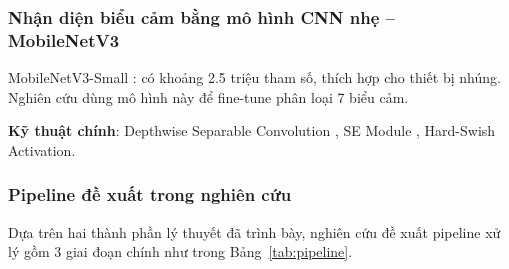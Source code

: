 \subsubsection{Nhận diện biểu cảm bằng mô hình CNN nhẹ – MobileNetV3}
MobileNetV3-Small \cite{howard2019mobilenetv3}: có khoảng 2.5 triệu tham số, thích hợp cho thiết bị nhúng. Nghiên cứu dùng mô hình này để fine-tune phân loại 7 biểu cảm.\par
\textbf{Kỹ thuật chính}: Depthwise Separable Convolution \cite{howard2017mobilenets}, SE Module \cite{hu2018squeeze}, Hard-Swish Activation.

\subsubsection{Pipeline đề xuất trong nghiên cứu}
Dựa trên hai thành phần lý thuyết đã trình bày, nghiên cứu đề xuất pipeline xử lý gồm 3 giai đoạn chính như trong Bảng~\ref{tab:pipeline}.

